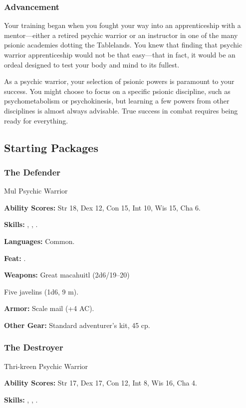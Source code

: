 \subsubsection{Advancement}
Your training began when you fought your way into an apprenticeship with a mentor---either a retired psychic warrior or an instructor in one of the many psionic academies dotting the Tablelands. You knew that finding that psychic warrior apprenticeship would not be that easy---that in fact, it would be an ordeal designed to test your body and mind to its fullest.

As a psychic warrior, your selection of psionic powers is paramount to your success. You might choose to focus on a specific psionic discipline, such as psychometabolism or psychokinesis, but learning a few powers from other disciplines is almost always advisable. True success in combat requires being ready for everything.

\vskip4cm
\subsection{Starting Packages}
\subsubsection{The Defender}
Mul Psychic Warrior

\textbf{Ability Scores:} Str 18, Dex 12, Con 15, Int 10, Wis 15, Cha 6.

\textbf{Skills:} , , .

\textbf{Languages:} Common.

\textbf{Feat:} .

\textbf{Weapons:} Great macahuitl (2d6/19--20)

Five javelins (1d6, 9 m).

\textbf{Armor:} Scale mail (+4 AC).

\textbf{Other Gear:} Standard adventurer's kit, 45 cp.

\vskip1cm
\subsubsection{The Destroyer}
Thri-kreen Psychic Warrior

\textbf{Ability Scores:} Str 17, Dex 17, Con 12, Int 8, Wis 16, Cha 4.

\textbf{Skills:} , , .

